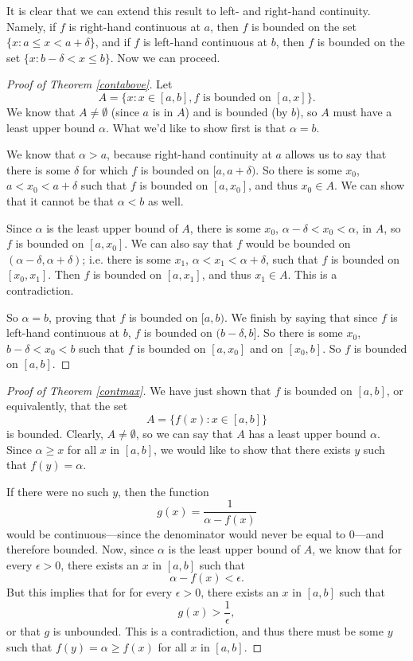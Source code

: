 It is clear that we can extend this result to left- and right-hand continuity. Namely, if $f$ is right-hand continuous at $a$, then $f$ is bounded on the set $\{x: a \le x < a + \delta\}$, and if $f$ is left-hand continuous at $b$, then $f$ is bounded on the set $\{x: b - \delta < x \le b\}$. Now we can proceed.

\begin{proof}[Proof of Theorem \ref{contabove}]
Let
\[ A = \{x: x \in [a, b], f \textrm{ is bounded on } [a, x]\}. \]
We know that $A \ne \emptyset$ (since $a$ is in $A$) and is bounded (by $b$), so $A$ must have a least upper bound $\alpha$. What we'd like to show first is that $\alpha = b$.

We know that $\alpha > a$, because right-hand continuity at $a$ allows us to say that there is some $\delta$ for which $f$ is bounded on $[a, a + \delta)$. So there is some $x_0$, $a < x_0 < a + \delta$ such that $f$ is bounded on $[a, x_0]$, and thus $x_0 \in A$. We can show that it cannot be that $\alpha < b$ as well. 

Since $\alpha$ is the least upper bound of $A$, there is some $x_0$, $\alpha - \delta < x_0 < \alpha$, in $A$, so $f$ is bounded on $[a, x_0]$. We can also say that $f$ would be bounded on $(\alpha - \delta, \alpha + \delta)$; i.e. there is some $x_1$, $\alpha < x_1 < \alpha + \delta$, such that $f$ is bounded on $[x_0, x_1]$. Then $f$ is bounded on $[a, x_1]$, and thus $x_1 \in A$. This is a contradiction.

So $\alpha = b$, proving that $f$ is bounded on $[a, b)$. We finish by saying that since $f$ is left-hand continuous at $b$, $f$ is bounded on $(b - \delta, b]$. So there is some $x_0$, $b - \delta < x_0 < b$ such that $f$ is bounded on $[a, x_0]$ and on $[x_0, b]$. So $f$ is bounded on $[a, b]$.
\end{proof}

\begin{proof}[Proof of Theorem \ref{contmax}]
We have just shown that $f$ is bounded on $[a, b]$, or equivalently, that the set
\[ A = \{f(x): x \in [a, b]\} \]
is bounded. Clearly, $A \ne \emptyset$, so we can say that $A$ has a least upper bound $\alpha$. Since $\alpha \ge x$ for all $x$ in $[a, b]$, we would like to show that there exists $y$ such that $f(y) = \alpha$.

If there were no such $y$, then the function
\[ g(x) = \frac{1}{\alpha - f(x)} \]
would be continuous---since the denominator would never be equal to 0---and therefore bounded. Now, since $\alpha$ is the least upper bound of $A$, we know that for every $\epsilon > 0$, there exists an $x$ in $[a, b]$ such that 
\[ \alpha - f(x) < \epsilon. \]
But this implies that for for every $\epsilon > 0$, there exists an $x$ in $[a, b]$ such that 
\[ g(x) > \frac{1}{\epsilon}, \]
or that $g$ is unbounded. This is a contradiction, and thus there must be some $y$ such that $f(y) = \alpha \ge f(x)$ for all $x$ in $[a, b]$.
\end{proof}

